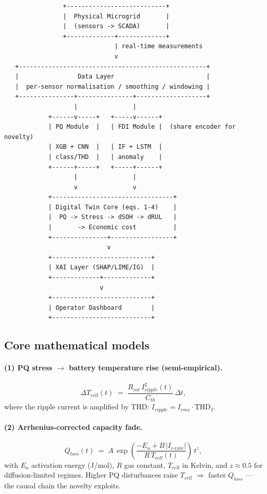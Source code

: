 \documentclass[11pt,a4paper]{article}
\begin{document}
\begin{lstlisting}
                +---------------------------+
                |  Physical Microgrid       |
                |  (sensors -> SCADA)       |
                +-------------+-------------+
                              | real-time measurements
                              v
   +---------------------------------------------------+
   |                Data Layer                         |
   |  per-sensor normalisation / smoothing / windowing |
   +---------------+---------------+-------------------+
                   |               |
            +------v-----+   +-----v------+
            | PQ Module  |   | FDI Module |  (share encoder for novelty)
            | XGB + CNN  |   | IF + LSTM  |
            | class/THD  |   | anomaly    |
            +------+-----+   +-----+------+
                   |               |
                   v               v
            +---------------------------------+
            | Digital Twin Core (eqs. 1-4)    |
            |  PQ -> Stress -> dSOH -> dRUL   |
            |       -> Economic cost          |
            +---------------+-----------------+
                            v
            +---------------------------+
            | XAI Layer (SHAP/LIME/IG)  |
            +-------------+-------------+
                          v
            +---------------------------+
            | Operator Dashboard        |
            +---------------------------+
\end{lstlisting}

\subsection{Core mathematical models}

\paragraph{(1) PQ stress $\to$ battery temperature rise (semi-empirical).}
\begin{equation}
    \Delta T_{cell}(t) \;=\; \frac{R_{int}\, I_{ripple}^{2}(t)}{C_{th}}\,\Delta t,
\end{equation}
where the ripple current is amplified by THD: $I_{ripple}=I_{rms}\cdot\mathrm{THD}_I$.

\paragraph{(2) Arrhenius-corrected capacity fade.}
\begin{equation}
    Q_{loss}(t) \;=\; A \,\exp\!\left(\frac{-E_a + B\,|I_{c\text{-rate}}|}{R\,T_{cell}(t)}\right)\, t^{z},
\end{equation}
with $E_a$ activation energy (J/mol), $R$ gas constant, $T_{cell}$ in
Kelvin, and $z\approx 0.5$ for diffusion-limited regimes. Higher PQ
disturbances raise $T_{cell}$ $\Rightarrow$ faster $Q_{loss}$ --- the
causal chain the novelty exploits.
\end{document}

